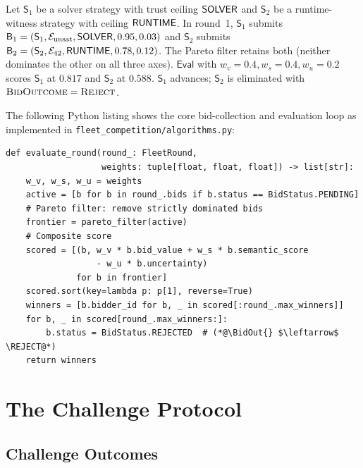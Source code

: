 \documentclass[11pt]{article}
\providecommand{\Strat}{\mathsf{S}}               %
\providecommand{\Bid}{\mathsf{B}}                 %
\providecommand{\Eval}{\mathsf{Eval}}             %
\providecommand{\BidOut}{\textsc{BidOutcome}}     %
\providecommand{\REJECT}{\textsc{Reject}}
\begin{document}
\begin{example}\label{ex:solvervsruntime}
  Let $\Strat_1$ be a \QFLIA{} solver strategy with trust ceiling $\mathsf{SOLVER}$
  and $\Strat_2$ be a runtime-witness strategy with ceiling $\mathsf{RUNTIME}$.  In
  round~1, $\Strat_1$ submits $\Bid_1 = (\Strat_1, \evid_{\mathrm{unsat}},
  \Tsolver, 0.95, 0.03)$ and $\Strat_2$ submits $\Bid_2 = (\Strat_2,
  \evid_{42}, \Truntime, 0.78, 0.12)$.  The Pareto filter retains both (neither
  dominates the other on all three axes).  $\Eval$ with $w_v = 0.4, w_s = 0.4,
  w_u = 0.2$ scores $\Strat_1$ at $0.817$ and $\Strat_2$ at $0.588$.
  $\Strat_1$ advances; $\Strat_2$ is eliminated with $\BidOut = \REJECT$.
\end{example}

The following Python listing shows the core bid-collection and evaluation loop
as implemented in \texttt{fleet\_competition/algorithms.py}:

\begin{lstlisting}[style=jugeo-python, caption={Multi-criterion bid evaluation
  loop (\texttt{fleet\_competition/algorithms.py})},
  label={lst:eval}]
def evaluate_round(round_: FleetRound,
                   weights: tuple[float, float, float]) -> list[str]:
    w_v, w_s, w_u = weights
    active = [b for b in round_.bids if b.status == BidStatus.PENDING]
    # Pareto filter: remove strictly dominated bids
    frontier = pareto_filter(active)
    # Composite score
    scored = [(b, w_v * b.bid_value + w_s * b.semantic_score
                  - w_u * b.uncertainty)
              for b in frontier]
    scored.sort(key=lambda p: p[1], reverse=True)
    winners = [b.bidder_id for b, _ in scored[:round_.max_winners]]
    for b, _ in scored[round_.max_winners:]:
        b.status = BidStatus.REJECTED  # (*@\BidOut{} $\leftarrow$ \REJECT@*)
    return winners
\end{lstlisting}

\section{The Challenge Protocol}\label{sec:challenge}

\subsection{Challenge Outcomes}
\end{document}
